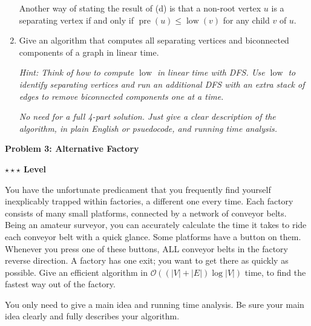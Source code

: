 \documentclass{article}\usepackage[utf8]{inputenc}
\begin{document}
\begin{enumerate}
\noindent Another way of stating the result of (d) is that a non-root vertex $u$ is a separating vertex if and only if $\operatorname{pre}(u)\leqslant \operatorname{low}(v)$ for any child $v$ of $u$.
\BeginSolution %

\EndSolution
\item Give an algorithm that computes all separating vertices and biconnected components of a graph in linear time. 

\textit{Hint: Think of how to compute $\operatorname{low}$ in linear time with DFS. Use $\operatorname{low}$ to identify separating vertices and run an additional DFS with an extra stack of edges to remove biconnected components one at a time.}

\noindent \textit{No need for a full 4-part solution. Just give a clear description of the algorithm, in plain English or psuedocode, and running time analysis.}
\BeginSolution %

\EndSolution
\end{enumerate}

\clearpage

\vspace{-2mm}\noindent\begin{mybox}{\begin{center}\textbf{\color{black}Problem 3: Alternative Factory}\end{center}}\end{mybox}\vspace{-2mm}
\begin{myboxot}\noindent\textbf{$\star\star\star$ Level}\end{myboxot} 

\noindent You have the unfortunate predicament that you frequently find yourself inexplicably trapped within factories, a different one every time. Each factory consists of many small platforms, connected by a network of conveyor belts. Being an amateur surveyor, you can accurately calculate the time it takes to ride each conveyor belt with a quick glance. Some platforms have a button on them. Whenever you press one of these buttons, ALL conveyor belts in the factory reverse direction. A factory has one exit; you want to get there as quickly as possible. Give an efficient algorithm in $\mathcal{O}((|V|+|E|)\log{|V|})$ time, to find the fastest way out of the factory. 

\vspace{3pt}
\noindent You only need to give a main idea and running time analysis. Be sure your main idea clearly and fully describes your algorithm.
\end{document}

